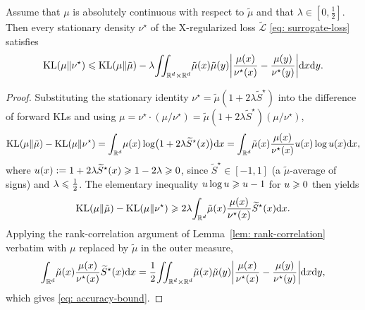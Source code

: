 \documentclass{article}
\begin{document}
\begin{theorem}
\label{thm: accuracy}
Assume that $\mu$ is absolutely continuous with respect to $\tilde\mu$ and that $\lambda \in [0, \frac12]$. Then every stationary density $\nu^\star$ of the X-regularized loss $\widetilde{\mathcal L}$ \eqref{eq: surrogate-loss} satisfies
\begin{equation}
    \mathrm{KL}(\mu\|\nu^\star) \leqslant \mathrm{KL}(\mu\|\tilde\mu) - \lambda\!\iint_{\mathbb R^d\times\mathbb R^d}\!\tilde\mu(x)\tilde\mu(y) \biggl|\frac{\mu(x)}{\nu^\star(x)} - \frac{\mu(y)}{\nu^\star(y)}\biggr| \mathrm{d} x \mathrm{d} y.
    \label{eq: accuracy-bound}
\end{equation}
\end{theorem}

\begin{proof}
Substituting the stationary identity $\nu^\star = \tilde\mu(1+2\lambda\widetilde S^\star)$ into the difference of forward KLs and using $\mu = \nu^\star \cdot (\mu/\nu^\star) = \tilde\mu(1+2\lambda\widetilde S^\star)(\mu/\nu^\star)$,
\begin{equation*}
    \mathrm{KL}(\mu\|\tilde\mu) - \mathrm{KL}(\mu\|\nu^\star)
    = \int_{\mathbb R^d}\!\mu(x)\log\bigl(1 + 2\lambda\widetilde S^\star(x)\bigr)\mathrm{d} x
    = \int_{\mathbb R^d}\!\tilde\mu(x) \frac{\mu(x)}{\nu^\star(x)}u(x)\log u(x)\mathrm{d} x,
\end{equation*}
where $u(x) := 1 + 2\lambda\widetilde S^\star(x) \geqslant 1 - 2\lambda \geqslant 0$, since $\widetilde S^\star \in [-1, 1]$ (a $\tilde\mu$-average of signs) and $\lambda \leqslant \frac12$. The elementary inequality $u\log u \geqslant u - 1$ for $u \geqslant 0$ then yields
\begin{equation*}
    \mathrm{KL}(\mu\|\tilde\mu) - \mathrm{KL}(\mu\|\nu^\star)
    \geqslant 2\lambda\!\int_{\mathbb R^d}\!\tilde\mu(x) \frac{\mu(x)}{\nu^\star(x)} \widetilde S^\star(x)\mathrm{d} x.
\end{equation*}
Applying the rank-correlation argument of Lemma~\ref{lem: rank-correlation} verbatim with $\mu$ replaced by $\tilde\mu$ in the outer measure,
\begin{equation*}
    \int_{\mathbb R^d}\!\tilde\mu(x)\frac{\mu(x)}{\nu^\star(x)}\widetilde S^\star(x)\mathrm{d} x = \frac{1}{2}\!\iint_{\mathbb R^d\times\mathbb R^d}\!\tilde\mu(x)\tilde\mu(y) \biggl|\frac{\mu(x)}{\nu^\star(x)} - \frac{\mu(y)}{\nu^\star(y)}\biggr|\mathrm{d} x\mathrm{d} y,
\end{equation*}
which gives \eqref{eq: accuracy-bound}.
\end{proof}
\end{document}
